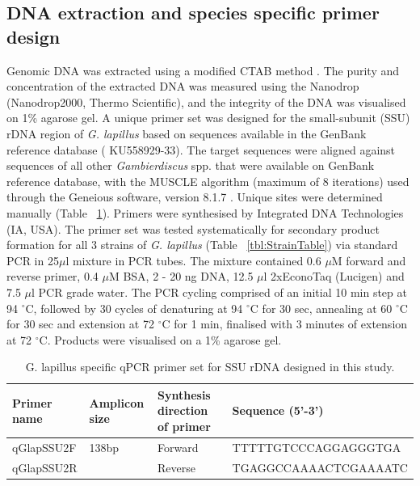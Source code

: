 \documentclass[12pt]{article}
\begin{document}
\subsection*{DNA extraction and species specific primer design}
\FloatBarrier
Genomic DNA was extracted using a modified CTAB method \citep{verma2016molecular}. 
The purity and concentration of the extracted DNA was measured using the Nanodrop (Nanodrop2000, Thermo Scientific), and the integrity of the DNA was visualised on 1\% agarose gel.
A unique primer set was designed for the small-subunit (SSU) rDNA region of \emph{G. lapillus} %
based on sequences available in the GenBank reference database (    KU558929-33). 
The target sequences were aligned against sequences of all other \emph{Gambierdiscus} spp. that were available on GenBank reference database, with the MUSCLE algorithm (maximum of 8 iterations) \citep{edgar2004muscle} used through the Geneious software, version 8.1.7 \citep{kearse2012geneious}. 
Unique sites were determined manually (Table ~\ref{tbl:PrimerTable}). 
Primers were synthesised by Integrated DNA Technologies (IA, USA).
The primer set was tested systematically for secondary product formation for all 3 strains of \emph{G. lapillus} (Table ~\ref{tbl:StrainTable}) via standard PCR in 25$\mu$l mixture in PCR tubes.  %
The mixture contained 0.6 $\mu$M forward and reverse primer, 0.4 $\mu$M BSA, 2 - 20 ng DNA, 12.5 $\mu$l 2xEconoTaq (Lucigen) and 7.5 $\mu$l PCR grade water.
The PCR cycling comprised of an initial 10 min step at 94 $^{\circ}$C, followed by 30 cycles of denaturing at 94 $^{\circ}$C for 30 sec, annealing at 60 $^{\circ}$C for 30 sec and extension at 72 $^{\circ}$C for 1 min, finalised with 3 minutes of extension at 72 $^{\circ}$C. 
Products were visualised on a 1\% agarose gel.
\begin{table}
\caption{G. lapillus specific qPCR primer set for SSU rDNA designed in this study.}
\label{tbl:PrimerTable}
\begin{tabular}{ | p{2.5cm} | p{2cm} | p{2cm} | p{6.5cm} | }
\hline
\textbf{Primer name} &\textbf{Amplicon size} &  \textbf{Synthesis direction of primer} & \textbf{Sequence (5'-3')} \\
\hline
qGlapSSU2F&138bp&Forward&TTTTTGTCCCAGGAGGGTGA\\
\hline
qGlapSSU2R&&Reverse&TGAGGCCAAAACTCGAAAATC\\
\hline
\end{tabular}
\end{table}
\FloatBarrier
\end{document}
